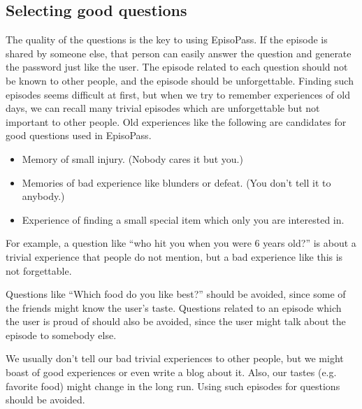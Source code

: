 \documentclass{sigchi}
\begin{document}
\subsection{Selecting good questions}


The quality of the questions is the key to using EpisoPass.
If the episode is shared by someone else,
that person can easily answer the question and generate the
password just like the user.
%
The episode related to each question should not be known to other people,
and the episode should be unforgettable.
%
Finding such episodes seems difficult at first, but
when we try to remember experiences of old days,
we can recall many trivial episodes which are unforgettable but
not important to other people.
%
Old experiences like the following are candidates for
good questions used in EpisoPass.

\begin{itemize}
\item Memory of small injury. (Nobody cares it but you.)

\item Memories of bad experience like blunders or defeat.
(You don't tell it to anybody.)

\item Experience of finding a small special item which only you are interested in.
\end{itemize}

For example, a question like
``who hit you when you were 6 years old?''
is about a trivial experience that people do not mention,
but a bad experience like this is not forgettable.

Questions like ``Which food do you like best?'' should be avoided,
since some of the friends might know the user's taste.
Questions related to an episode which the user is proud of should also be
avoided, since the user might talk about the episode to somebody else.

We usually don't tell our bad trivial experiences to other people,
but we might boast of good experiences or even write a blog about it.
Also, our tastes (e.g. favorite food) might change in the long run.
Using such episodes for questions should be avoided.

% 
% 
% 
% 
\end{document}
